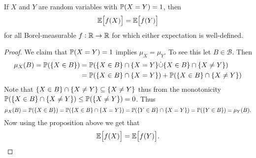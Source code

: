 \begin{corollary}
	If $ X $ and $ Y $ are random variables with $ \mathbb{P}(X=Y) = 1 $, then \[ \mathbb{E}\big[f(X)\big] = \mathbb{E}\big[f(Y)\big] \]
	for all Borel-measurable $ f:\mathbb{R} \to \mathbb{R} $ for which either expectation is well-defined. 
\end{corollary}
\begin{proof}
	We claim that $ \mathbb{P}(X=Y) = 1 $ implies $ \mu_X = \mu_Y $. To see this let $ B \in \mathcal{B} $. Then
	\begin{align*}
		\mu_X (B) = \mathbb{P}(\{X\in B\}) &= \mathbb{P}(\{X\in B\}\cap\{X=Y\} \dot{\cup} \{X\in B\}\cap \{X\neq Y\}) \\
		&=\mathbb{P}(\{X\in B\}\cap\{X=Y\}) + \mathbb{P}(\{X\in B\}\cap \{X\neq Y\})
	\end{align*}
	Note that $ \{X\in B\}\cap \{X \neq Y\} \subseteq \{X \neq Y\} $ thus from the monotonicity $ \mathbb{P}(\{X\in B\}\cap \{X \neq Y\}) \leq \mathbb{P}(\{X\neq Y\}) = 0 $. Thus
	\[ \mu_X (B) = \mathbb{P}(\{X\in B\}) = \mathbb{P}(\{X\in B\}\cap\{X=Y\}) = \mathbb{P}(\{Y\in B\}\cap\{X=Y\}) = \mathbb{P}(\{Y\in B\}) = \mu_Y(B). \]
	Now using the proposition above we get that
	\[ \mathbb{E}\big[f(X)\big] = \mathbb{E}\big[f(Y)\big]. \]
\end{proof}


